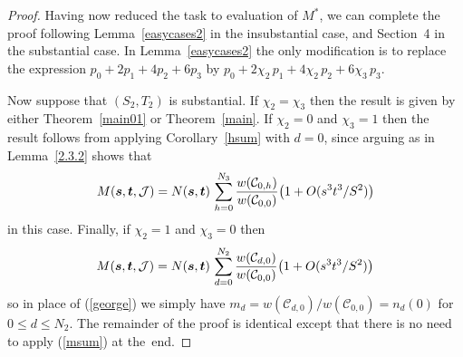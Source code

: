 \documentclass[12pt]{article}
\numberwithin{equation}{section}
\def\C{{\mathcal{C}}}
\def\J{{\mathcal{J}}}
\def\({\bigl(}   \def\){\bigr)}
\def\svec{{\boldsymbol{s}}}
\def\tvec{{\boldsymbol{t}}}
\begin{document}
\begin{proof}
Having now reduced the task to evaluation of $M^\ast$, we can
complete the proof following Lemma~\ref{easycases2} in the
insubstantial case, and Section~4 in the substantial case.
In Lemma~\ref{easycases2} the only modification is to replace
the expression $p_0 + 2p_1 + 4p_2 + 6p_3$ by
$p_0 + 2\chi_2\, p_1 + 4\chi_2\, p_2 + 6\chi_3\, p_3$.

Now suppose that $(S_2,T_2)$ is substantial.
If $\chi_2=\chi_3$ then the result is given by either
Theorem~\ref{main01} or Theorem~\ref{main}.
If $\chi_2=0$ and $\chi_3=1$ then the result follows from applying
Corollary~\ref{hsum} with $d=0$, since arguing as in Lemma~\ref{2.3.2}
shows that
\[ M(\svec,\tvec,\J) = 
     N(\svec,\tvec)\, \sum_{h=0}^{N_3}
         \frac{w(\C_{0,h})}{w(\C_{0,0})} \(1 + O(s^3t^3/S^2)\)
         \vadjust{\vskip-1ex}
\]
in this case.  
Finally, if $\chi_2=1$ and $\chi_3=0$
then
\[ M(\svec,\tvec,\J) = 
     N(\svec,\tvec)\, \sum_{d=0}^{N_2}
         \frac{w(\C_{d,0})}{w(\C_{0,0})} \(1 + O(s^3t^3/S^2)\)
         \vadjust{\vskip-1ex}
\]
so in place of (\ref{george}) we simply have
$m_d =  w(\C_{d,0})/w(\C_{0,0}) = n_d(0)$ for $0\leq d\leq N_2$.
The remainder of the proof is identical except that there is
no need to apply (\ref{msum}) at the~end.
\end{proof}
\end{document}
